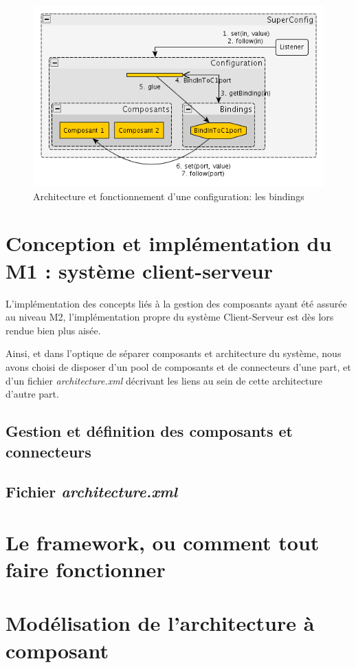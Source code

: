 \documentclass[a4paper, titlepage]{article}
\begin{document}
			\begin{figure}[ht]
				\centering
				\includegraphics[width=1.00\textwidth]{obsimpl2.png}
				\caption{Architecture et fonctionnement d'une configuration: les
          			  bindings}
				\label{fig:obsimpl2}
			\end{figure}
			
			
	\section{Conception et implémentation du M1 : système client-serveur}
	
	  L'implémentation des concepts liés à la gestion des composants ayant été
	  assurée au niveau M2, l'implémentation propre du système Client-Serveur est
	  dès lors rendue bien plus aisée.
	  
    Ainsi, et dans l'optique de séparer composants et architecture du système,
    nous avons choisi de disposer d'un pool de composants et de connecteurs
    d'une part, et d'un fichier \emph{architecture.xml} décrivant les liens au
    sein de cette architecture d'autre part.
    
    \subsection{Gestion et définition des composants et connecteurs}
    
      
    
    \subsection{Fichier \emph{architecture.xml}}
    
      
	
	\section{Le framework, ou comment tout faire fonctionner}
	
	
	\section{Modélisation de l'architecture à composant}
	
	
	
	
\end{document}

